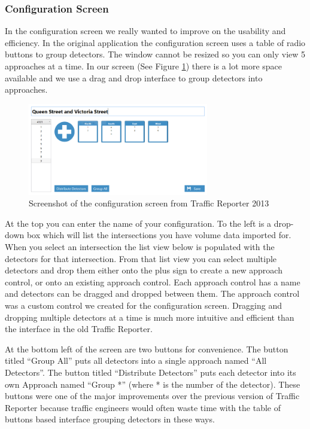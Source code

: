 \documentclass{article}
\begin{document}
\subsubsection{Configuration Screen}
In the configuration screen we really wanted to improve on the usability and efficiency. In the original application the configuration screen uses a table of radio buttons to group detectors. The window cannot be resized so you can only view 5 approaches at a time. In our screen (See Figure \ref{fig:newConfig}) there is a lot more space available and we use a drag and drop interface to group detectors into approaches. 

\begin{figure}[!b]
\centerline{\includegraphics[width=3.1in]{newConfig}}
\caption{Screenshot of the configuration screen from Traffic Reporter 2013}
\label{fig:newConfig}
\end{figure}

At the top you can enter the name of your configuration. To the left is a drop-down box which will list the intersections you have volume data imported for. When you select an intersection the list view below is populated with the detectors for that intersection. From that list view you can select multiple detectors and drop them either onto the plus sign to create a new approach control, or onto an existing approach control. Each approach control has a name and detectors can be dragged and dropped between them. The approach control was a custom control we created for the configuration screen. Dragging and dropping multiple detectors at a time is much more intuitive and efficient than the interface in the old Traffic Reporter.

At the bottom left of the screen are two buttons for convenience. The button titled ``Group All'' puts all detectors into a single approach named ``All Detectors''. The button titled ``Distribute Detectors'' puts each detector into its own Approach named ``Group *'' (where * is the number of the detector). These buttons were one of the major improvements over the previous version of Traffic Reporter because traffic engineers would often waste time with the table of buttons based interface grouping detectors in these ways.
\end{document}
